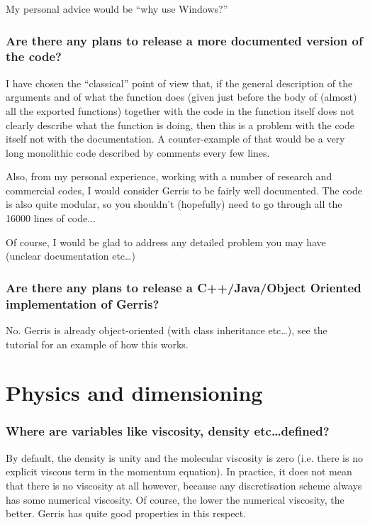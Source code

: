 \documentclass[a4paper]{article}
\begin{document}
My personal advice would be ``why use Windows?''

\subsubsection{Are there any plans to release a more documented version of the code?}

I have chosen the ``classical'' point of view that, if the general
description of the arguments and of what the function does (given just
before the body of (almost) all the exported functions) together with
the code in the function itself does not clearly describe what the
function is doing, then this is a problem with the code itself not
with the documentation. A counter-example of that would be a very long
monolithic code described by comments every few lines.

Also, from my personal experience, working with a number of research
and commercial codes, I would consider Gerris to be fairly well documented.
The code is also quite modular, so you shouldn't (hopefully) need to
go through all the 16000 lines of code...

Of course, I would be glad to address any detailed problem you may
have (unclear documentation etc\dots)

\subsubsection{Are there any plans to release a C++/Java/Object Oriented 
implementation of Gerris?}

No. Gerris is already object-oriented (with class inheritance etc\dots),
see the tutorial for an example of how this works.

\section{Physics and dimensioning}

\subsubsection{Where are variables like viscosity, density etc\dots defined?}

By default, the density is unity and the molecular viscosity is
zero (i.e. there is no explicit viscous term in the momentum
equation). In practice, it does not mean that there is no viscosity at 
all however, because any discretisation scheme always has
some numerical viscosity. Of course, the lower the numerical
viscosity, the better. Gerris has quite good properties in this
respect.
\end{document}
